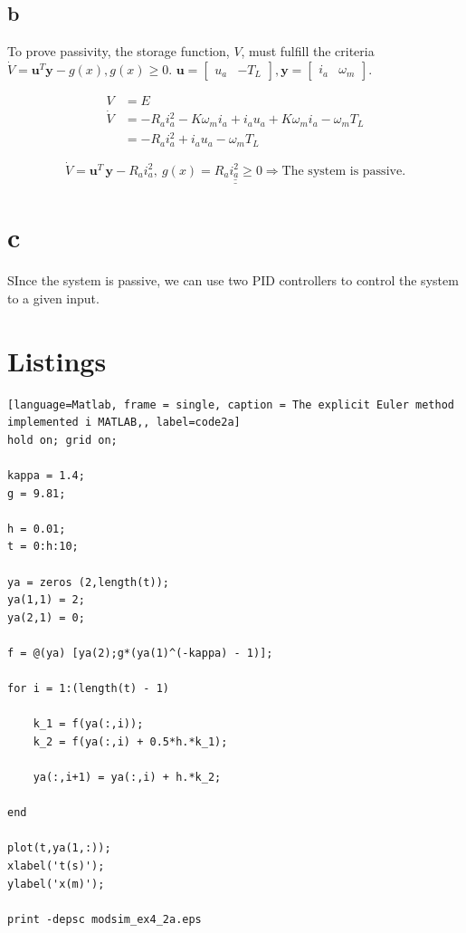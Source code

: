 \documentclass{article}
\begin{document}
\subsection{b}
To prove passivity, the storage function, $V$, must fulfill the criteria $\dot V = \mathbf{u}^T\mathbf{y} - g(x), g(x) \geq 0$. $\mathbf{u} = \begin{bmatrix} u_a & -T_L\end{bmatrix}, \mathbf{y} = \begin{bmatrix} i_a & \omega_m\end{bmatrix}$.

\begin{align*}
	V &= E\\
	\dot V &= -R_ai_a^2 - K\omega_mi_a + i_au_a+K\omega_mi_a - \omega_mT_L\\
	&= -R_ai_a^2 + i_au_a - \omega_mT_L
	
\end{align*}

\begin{equation*}
	\underline{\underline{\dot V =\mathbf{u}^T\,\mathbf{y} - R_ai_a^2, \: g(x) = R_ai_a^2 \geq 0 \Rightarrow \text{The system is passive.}}}
\end{equation*}

\section{c}

SInce the system is passive, we can use two PID controllers to control the system to a given input. 
\section{Listings}


\begin{lstlisting}[language=Matlab, frame = single, caption = The explicit Euler method implemented i MATLAB,, label=code2a]
hold on; grid on;

kappa = 1.4;
g = 9.81;

h = 0.01;
t = 0:h:10;

ya = zeros (2,length(t));
ya(1,1) = 2;
ya(2,1) = 0;

f = @(ya) [ya(2);g*(ya(1)^(-kappa) - 1)];

for i = 1:(length(t) - 1)
    
    k_1 = f(ya(:,i));
    k_2 = f(ya(:,i) + 0.5*h.*k_1);
    
    ya(:,i+1) = ya(:,i) + h.*k_2;
    
end

plot(t,ya(1,:));
xlabel('t(s)');
ylabel('x(m)');

print -depsc modsim_ex4_2a.eps
\end{lstlisting}
\end{document}
